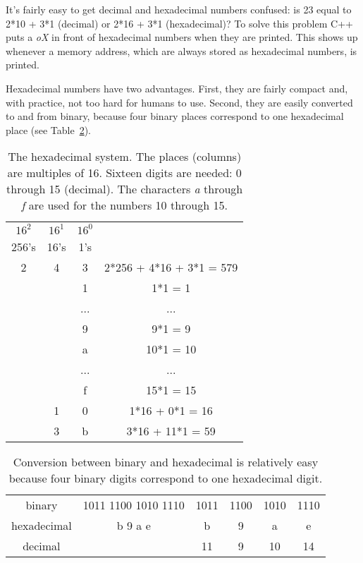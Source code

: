 \documentclass[11pt]{article} %
\begin{document}
It's fairly easy to get decimal and hexadecimal numbers confused: is 23 equal to 2*10 + 3*1 (decimal) or 2*16 + 3*1 (hexadecimal)?  To solve this problem C++ puts a \emph{oX} in front of hexadecimal numbers when they are printed. This shows up whenever a memory address, which are always stored as hexadecimal numbers, is printed.

Hexadecimal numbers have two advantages.  First, they are fairly compact and, with practice, not too hard for humans to use.  Second, they are easily converted to and from binary, because four binary places correspond to one hexadecimal place (see Table~\ref{tab:hexbin}).

\begin{table}
\centering
\begin{tabular}{ c | c | c || c  }
$16^{2}$ &$16^1$&$16^0$&\\
   256's & 16's & 1's & \\
\hline
   2 & 4 & 3 & 2*256 + 4*16 + 3*1 = 579 \\
& & 1 & 1*1 = 1\\
& & ... & ...\\
& & 9 & 9*1 = 9 \\
& & a & 10*1 = 10\\
& & ... & ...\\
& & f & 15*1 = 15 \\
& 1 & 0 & 1*16 + 0*1 = 16\\
& 3 & b & 3*16 + 11*1 = 59\\
\end{tabular}
\caption{The hexadecimal system.  The places (columns) are multiples of 16.  Sixteen digits are needed: 0 through 15 (decimal).  The characters \emph{a} through \emph{f} are used for the numbers 10 through 15.}\label{tab:hexadecimal}
\end{table}

\begin{table}
\centering
\begin{tabular}{c |  c || c | c | c | c }
binary &   1011 1100 1010 1110 &  1011 & 1100 & 1010 & 1110 \\
hexadecimal &  b 9 a e & b & 9 & a & e\\
decimal & & 11 & 9 & 10 & 14 \\
\end{tabular}
\caption{Conversion between binary and hexadecimal is relatively easy because four binary digits correspond to one hexadecimal digit.  }\label{tab:hexbin}
\end{table}
\end{document}
